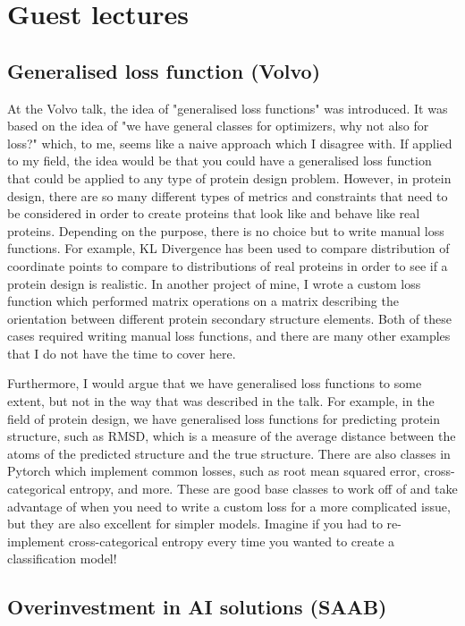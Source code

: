 \documentclass[a4paper, 11pt]{article} %
\begin{document}
\section*{Guest lectures}

\subsection*{Generalised loss function (Volvo)}

At the Volvo talk, the idea of "generalised loss functions" was introduced. It was based on the idea of "we have general classes for optimizers, why not also for loss?" which, to me, seems like a naive approach which I disagree with. If applied to my field, the idea would be that you could have a generalised loss function that could be applied to any type of protein design problem. However, in protein design, there are so many different types of metrics and constraints that need to be considered in order to create proteins that look like and behave like real proteins. Depending on the purpose, there is no choice but to write manual loss functions. For example, KL Divergence has been used to compare distribution of coordinate points to compare to distributions of real proteins in order to see if a protein design is realistic. In another project of mine, I wrote a custom loss function which performed matrix operations on a matrix describing the orientation between different protein secondary structure elements. Both of these cases required writing manual loss functions, and there are many other examples that I do not have the time to cover here.

Furthermore, I would argue that we have generalised loss functions to some extent, but not in the way that was described in the talk. For example, in the field of protein design, we have generalised loss functions for predicting protein structure, such as RMSD, which is a measure of the average distance between the atoms of the predicted structure and the true structure. There are also classes in Pytorch which implement common losses, such as root mean squared error, cross-categorical entropy, and more. These are good base classes to work off of and take advantage of when you need to write a custom loss for a more complicated issue, but they are also excellent for simpler models. Imagine if you had to re-implement cross-categorical entropy every time you wanted to create a classification model!

\subsection*{Overinvestment in AI solutions (SAAB)}
\end{document}
